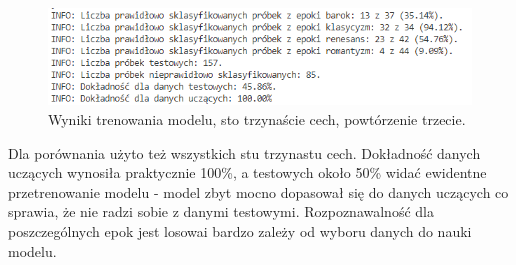 \documentclass[printmode, eng]{mgr}
\newcommand\tab[1][1cm]{\hspace*{#1}}
\begin{document}
\begin{figure}[H]
\centering
\includegraphics[scale=0.9]{wyniki_all_2.png}
\caption{Wyniki trenowania modelu, sto trzynaście cech, powtórzenie trzecie.}
\end{figure}
\tab Dla porównania użyto też wszystkich stu trzynastu cech. Dokładność danych uczących wynosiła praktycznie 100\%, a testowych około 50\% widać ewidentne przetrenowanie modelu - model zbyt mocno dopasował się do danych uczących co sprawia, że nie radzi sobie z danymi testowymi. Rozpoznawalność dla poszczególnych epok jest losowa\linebreak i bardzo zależy od wyboru danych do nauki modelu.
\end{document}

